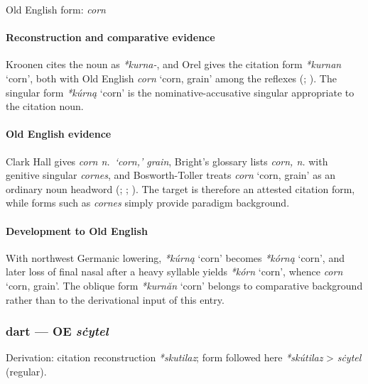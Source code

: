 \documentclass[
  british,
  a4paper,
]{article}
\providecommand{\Recon}[1]{\emph{*#1}}
\begin{document}
Old English form: \emph{corn}

\paragraph{Reconstruction and comparative
evidence}\label{reconstruction-and-comparative-evidence-14}

Kroonen cites the noun as \emph{*kurna-}, and Orel gives the citation
form \Recon{kurnan} `corn', both with Old English {\emph{corn}} `corn,
grain' among the reflexes (;
). The singular form
\Recon{kúrną} `corn' is the nominative-accusative singular appropriate
to the citation noun.

\paragraph{Old English evidence}\label{old-english-evidence-14}

Clark Hall gives \emph{corn n.~`corn,' grain}, Bright's glossary lists
\emph{corn, n.} with genitive singular \emph{cornes}, and
Bosworth-Toller treats {\emph{corn}} `corn, grain' as an ordinary noun
headword (;
;
). The
target is therefore an attested citation form, while forms such as
\emph{cornes} simply provide paradigm background.

\paragraph{Development to Old
English}\label{development-to-old-english-14}

With northwest Germanic lowering, \Recon{kúrną} `corn' becomes
\Recon{kórną} `corn', and later loss of final nasal after a heavy
syllable yields \Recon{kórn} `corn', whence {\emph{corn}} `corn, grain'.
The oblique form \Recon{kurnăn} `corn' belongs to comparative background
rather than to the derivational input of this entry.

\subsubsection{\texorpdfstring{dart --- OE
\emph{sċytel}}{dart --- OE sċytel}}\label{dart-oe-sux10bytel}

Derivation: citation reconstruction \emph{*skutilaz}; form followed here
\emph{*skútilaz} \textgreater{} \emph{sċytel} (regular).
\end{document}
